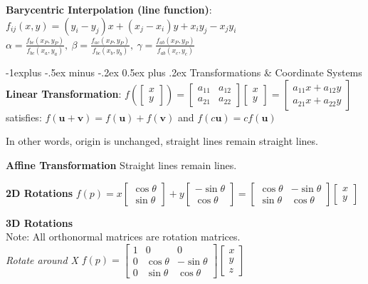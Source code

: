 \documentclass[letterpaper, 8pt]{extarticle}
\makeatletter
\renewcommand{\section}{\@startsection{section}{1}{0mm}%
                                {-1explus -.5ex minus -.2ex}%
                                {0.5ex plus .2ex}%
                                {\normalfont\normalsize\bfseries}}
\makeatother
\begin{document}
\begin{multicols*}{4}
\textbf{Barycentric Interpolation (line function)}:
$f_{ij}(x, y) = (y_i - y_j) x + (x_j - x_i)y + x_i y_j - x_j y_i$ \\
$\alpha = \frac{f_{bc}(x_P, y_P)}{f_{bc}(x_a, y_a)},\
\beta = \frac{f_{ac}(x_P, y_P)}{f_{bc}(x_b, y_b)},\
\gamma = \frac{f_{ab}(x_P, y_P)}{f_{ab}(x_c, y_c)}$

\section{Transformations \& Coordinate Systems}
\textbf{Linear Transformation}:
\(
f(\begin{bmatrix}
    x \\ y
\end{bmatrix})
= \begin{bmatrix}
    a_{11} & a_{12} \\
    a_{21} & a_{22}
\end{bmatrix}
\begin{bmatrix}
    x \\ y
\end{bmatrix}
=
\begin{bmatrix}
    a_{11} x + a_{12} y \\
    a_{21} x + a_{22} y
\end{bmatrix}
\)
satisfies: \(
f(\mathbf{u} + \mathbf{v})
= f(\mathbf{u}) + f(\mathbf{v})
\)
and
\(
f(c\mathbf{u}) = cf(\mathbf{u})
\)

In other words, origin is unchanged, straight lines remain straight lines.

\textbf{Affine Transformation}
Straight lines remain lines.

\textbf{2D Rotations}
\(
f(p)
= x \begin{bmatrix}
    \cos \theta \\ \sin \theta
\end{bmatrix}
+ y \begin{bmatrix}
    -\sin \theta \\ \cos \theta
\end{bmatrix}
= \begin{bmatrix}
    \cos \theta & - \sin \theta \\
    \sin \theta & \cos \theta
\end{bmatrix}
\begin{bmatrix}
    x \\ y
\end{bmatrix}
\)

\textbf{3D Rotations} \\
Note: All orthonormal matrices are rotation matrices. \\
\textit{Rotate around X}
\(
f(p) = \begin{bmatrix}
    1 & 0           & 0            \\
    0 & \cos \theta & -\sin \theta \\
    0 & \sin \theta & \cos \theta
\end{bmatrix}
\begin{bmatrix}
    x \\ y \\ z
\end{bmatrix}
\)


\end{multicols*}
\end{document}
